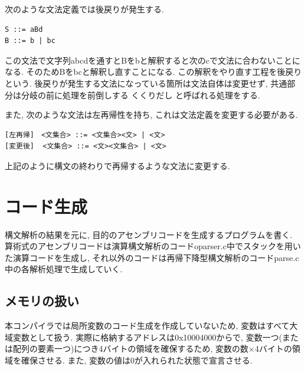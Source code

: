 \documentclass[a4j]{jarticle}
\begin{document}
次のような文法定義では後戻りが発生する.
\begin{verbatim}
S ::= aBd
B ::= b | bc 
\end{verbatim}
この文法で文字列abcdを通すとBをbと解釈すると次のcで文法に合わないことになる. 
そのためBをbcと解釈し直すことになる. この解釈をやり直す工程を後戻りという. 
後戻りが発生する文法になっている箇所は文法自体は変更せず, 共通部分は分岐の前に処理を前倒しする くくりだし と呼ばれる処理をする.

また, 次のような文法は左再帰性を持ち, これは文法定義を変更する必要がある.
\begin{verbatim}
[左再帰]　<文集合> ::= <文集合><文> | <文>
[変更後]  <文集合> ::= <文><文集合> | <文>
\end{verbatim}
上記のように構文の終わりで再帰するような文法に変更する. 

\section{コード生成}
構文解析の結果を元に, 目的のアセンブリコードを生成するプログラムを書く. 
算術式のアセンブリコードは演算構文解析のコードoparser.c中でスタックを用いた演算コードを生成し, それ以外のコードは再帰下降型構文解析のコードparse.c中の各解析処理で生成していく. 

\subsection{メモリの扱い}
本コンパイラでは局所変数のコード生成を作成していないため, 変数はすべて大域変数として扱う. 実際に格納するアドレスは0x10004000からで, 変数一つ(または配列の要素一つ)につき4バイトの領域を確保するため, 変数の数$×$4バイトの領域を確保させる. また, 変数の値は0が入れられた状態で宣言させる. 


\end{document}
